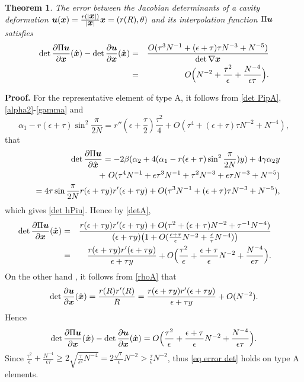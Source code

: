 \documentclass[12pt]{article}
\renewcommand{\vec}[1]{\mbox{\boldmath$#1$}}
\newtheorem{theorem}{Theorem}[section]
\numberwithin{equation}{section}
\begin{document}
\begin{theorem}\label{error det}
The error between the Jacobian
determinants of a cavity deformation
$\vec{u}(\vec{x})=\frac{r(|\vec{x}|)}{|\vec{x}|}\vec{x}=(r(R),\theta)$ and
its interpolation function $\Pi \vec{u}$ satisfies
\begin{eqnarray}
\det\frac{\partial \Pi \vec{u}}{\partial \vec{x}}(\hat{\vec{x}})-
\det \frac{\partial \vec{u}}{\partial \vec{x}}(\hat{\vec{x}})&=&
\frac{O(\tau^3N^{-1}+(\epsilon+\tau)\tau N^{-3} +N^{-5})}{\det \nabla \vec{x}}
\label{det hPiu}\\
&=&O\Big(N^{-2}+\frac{\tau^2}{\epsilon}+\frac{N^{-4}}{\epsilon \tau}\Big).\label{eq error det}
\end{eqnarray}
\end{theorem}
\textbf{Proof.} For the representative element of type A,
it follows from \eqref{det PipA}, \eqref{alpha2}-\eqref{gamma} and
$$
\alpha_1-r(\epsilon+\tau)\sin^2{\frac{\pi}{2N}}=
r''(\epsilon+\frac{\tau}{2})\frac{\tau^2}
{4}+O(\tau^4+(\epsilon+\tau)\tau N^{-2}+N^{-4}),
$$
that
\begin{eqnarray*}
& & \hspace*{-8mm}\det \frac{\partial \Pi \vec{u}}{\partial \hat{\vec{x}}}=
-2\beta(\alpha_2+4(\alpha_1- r(\epsilon+\tau)\sin^2{\frac{\pi}{2N}})y)
+4\gamma \alpha_2 y \\ && \ \ \ \ \ \ \ \ \ \ + \ O(\tau^4 N^{-1}+
\epsilon \tau^3 N^{-1}+\tau^2N^{-3}+\epsilon \tau N^{-3}+N^{-5}) \\
&&=4\tau \sin{\frac{\pi}{2N}}r(\epsilon+\tau y)r'(\epsilon+\tau y)+
O(\tau^3N^{-1}+(\epsilon+\tau)\tau N^{-3} +N^{-5}),
\end{eqnarray*}
which gives \eqref{det hPiu}.
Hence by \eqref{detA},
\vspace*{-3mm}
\begin{eqnarray*}\hspace*{-8mm}
\det \frac{\partial \Pi \vec{u}}{\partial \vec{x}}(\hat{\vec{x}})&=&
\frac{r(\epsilon+\tau y)r'(\epsilon+\tau y)+O(\tau^2+(\epsilon+\tau) N^{-2}+
\tau^{-1}N^{-4})} {(\epsilon+\tau y)\big(1+O(\frac{\epsilon+\tau}{\epsilon}
N^{-2}+\frac{\epsilon}{\tau}N^{-4})\big)} \\
&=&\frac{r(\epsilon+\tau y)r'(\epsilon+\tau y)}{\epsilon+\tau y}+
O\Big(\frac{\tau^2}{\epsilon}+\frac{\epsilon+\tau}{\epsilon}N^{-2}
+\frac{N^{-4}}{\epsilon \tau}\Big).
\end{eqnarray*}
On the other hand , it follows from \eqref{rhoA} that
$$
\det \frac{\partial \vec{u}}{\partial \vec{x}}(\hat{\vec{x}})=
\frac{r(R)r'(R)}{R}=
\frac{r(\epsilon+\tau y)r'(\epsilon+\tau y)}{\epsilon+\tau y}+
O(N^{-2}).
$$
Hence
$$
\det\frac{\partial \Pi \vec{u}}{\partial \vec{x}}(\hat{\vec{x}})-
\det \frac{\partial \vec{u}}{\partial \vec{x}}(\hat{\vec{x}})=
O\Big(\frac{\tau^2}{\epsilon}+\frac{\epsilon+\tau}{\epsilon}N^{-2}+
\frac{N^{-4}}{\epsilon \tau}\Big).
$$
Since $\frac{\tau^2}{\epsilon}+\frac{N^{-4}}{\epsilon \tau}\ge
2\sqrt{\frac{\tau}{\epsilon^2}N^{-4}}=2\frac{\sqrt{\tau}}{\epsilon}N^{-2}>
\frac{\tau}{\epsilon}N^{-2}$,
thus \eqref{eq error det} holds on type A elements.
\end{document}
